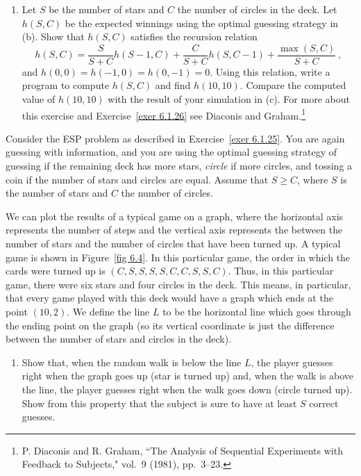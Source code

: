 \begin{LJSItem}
\begin{enumerate}
\item Let $S$ be the number of stars and $C$ the number of circles in the deck.  Let
$h(S,C)$ be the expected winnings using the optimal guessing strategy in (b).  Show
that $h(S,C)$ satisfies the recursion relation
$$ h(S,C) = \frac S{S + C} h(S - 1,C) + \frac C{S + C} h(S,C - 1) + \frac
{\max(S,C)}{S + C}\ ,
$$ and $h(0,0) = h(-1,0) = h(0,-1) = 0$.  Using this relation, write a program to
compute $h(S,C)$ and find $h(10,10)$.  Compare the computed value of $h(10,10)$ with
the result of your simulation in (c).  For more about this exercise and
Exercise~\ref{exer 6.1.26} see Diaconis and Graham.\footnote{P. Diaconis and R. Graham, ``The Analysis of Sequential Experiments with Feedback to
Subjects,"  vol.~9 (1981), pp.~3--23.}
\end{enumerate}

\istar\label{exer 6.1.26} Consider the ESP problem as described in Exercise~\ref{exer
6.1.25}.  You are again guessing with information, and you are using the optimal
guessing strategy of guessing  if the remaining deck has more stars, {\em
circle} if more circles, and tossing a coin if the number of stars and circles are
equal.  Assume that $S \geq C$, where $S$ is the number of stars and $C$ the number
of circles.
\par We can plot the results of a typical game on a graph, where the horizontal axis
represents the number of steps and the vertical axis represents the 
between the number of stars and the number of circles that have been turned up.  A
typical game is shown in Figure~\ref{fig 6.4}.  In this particular game, the order in
which the cards were turned up is $(C,S,S,S,S,C,C,S,S,C)$.  Thus, in this particular
game, there were six stars and four circles in the deck.  This means, in particular,
that every game played with this deck would have a graph which ends at the point
$(10, 2)$.  We define the line $L$ to be the horizontal line which goes through the
ending point on the graph (so its vertical coordinate is just the difference between
the number of stars and circles in the deck).


\begin{enumerate}
\item Show that, when the random walk is below the line $L$, the player guesses right
when the graph goes up (star is turned up) and, when the walk is above the line, the
player guesses right when the walk goes down (circle turned up).  Show from this
property that the subject is sure to have at least $S$ correct guesses.


\end{enumerate}
\end{LJSItem}
